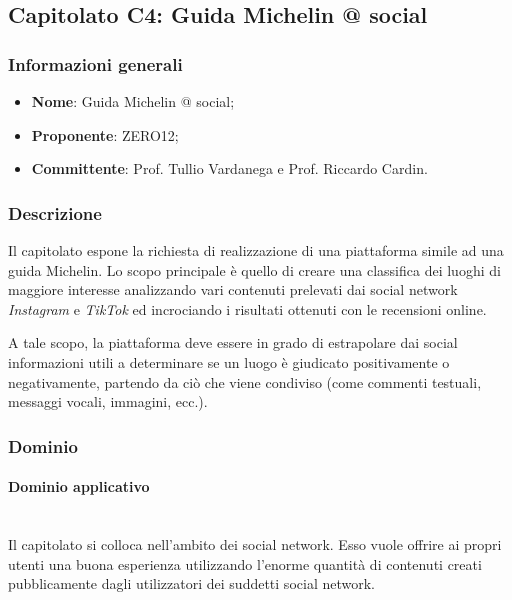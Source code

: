 \documentclass[11pt]{article}
\begin{document}
\newpage


\subsection{Capitolato C4: Guida Michelin @ social}

    \subsubsection{Informazioni generali}
    \begin{itemize}
        \item \textbf{Nome}: Guida Michelin @ social;
        \item \textbf{Proponente}: ZERO12;
        \item \textbf{Committente}: Prof. Tullio Vardanega e Prof. Riccardo Cardin.
    \end{itemize}
    
    \subsubsection{Descrizione}
    Il capitolato espone la richiesta di realizzazione di una piattaforma simile ad una guida Michelin. Lo scopo principale è quello
    di creare una classifica dei luoghi di maggiore interesse analizzando vari contenuti prelevati dai social network \textit{Instagram}
    e \textit{TikTok} ed incrociando i risultati ottenuti con le recensioni online.
    
    A tale scopo, la piattaforma deve essere in grado di estrapolare dai social informazioni utili a determinare se un luogo è giudicato
    positivamente o negativamente, partendo da ciò che viene condiviso (come commenti testuali, messaggi vocali, immagini, ecc.).
    
    \subsubsection{Dominio}
        \paragraph{Dominio applicativo}~\\
        
        \noindent
        Il capitolato si colloca nell'ambito dei social network. Esso vuole offrire ai propri utenti una buona esperienza utilizzando
        l'enorme quantità di contenuti creati pubblicamente dagli utilizzatori dei suddetti social network.
        
\end{document}
